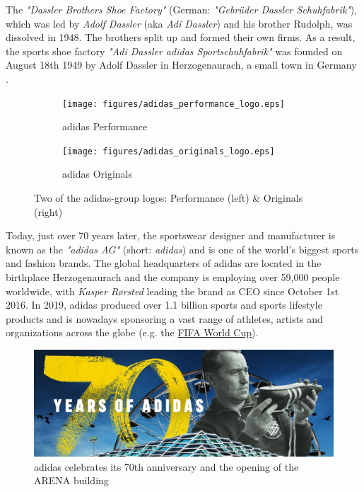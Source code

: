 

The \textit{"Dassler Brothers Shoe Factory"} (German: \textit{"Gebrüder Dassler Schuhfabrik"}), which was led by \textit{Adolf Dassler} (aka \textit{Adi Dassler}) and his brother Rudolph, was dissolved in 1948. The brothers split up and formed their own firms. As a result, the sports shoe factory \textit{"Adi Dassler adidas Sportschuhfabrik"} was founded on August 18th 1949 by Adolf Dassler in Herzogenaurach, a small town in Germany \citep{adidas-group}. \\

\begin{figure}[H]
\centering
\begin{subfigure}{.4\textwidth}
  \centering
  \texttt{[image: figures/adidas\_performance\_logo.eps]}
  \caption{adidas Performance}
  \label{fig:adidas_performance_logo}
\end{subfigure}
\begin{subfigure}{.4\textwidth}
  \centering
  \texttt{[image: figures/adidas\_originals\_logo.eps]}
  \caption{adidas Originals}
  \label{fig:adidas_originals_logo}
\end{subfigure}
\caption{Two of the adidas-group logos: Performance (left) \& Originals (right) \\ \citep{adidasmediacenter}}
\label{fig:adidas_logos}
\end{figure} 


Today, just over 70 years later, the sportswear designer and manufacturer is known as the \textit{"adidas AG"} (short: \textit{adidas}) and is one of the world's biggest sports and fashion brands. The global headquarters of adidas are located in the birthplace Herzogenaurach and the company is employing over 59,000 people worldwide, with \textit{Kasper R\o rsted} leading the brand as CEO since October 1st 2016. In 2019, adidas produced over 1.1 billion sports and sports lifestyle products \citep{adidas-group-profile} and is nowadays sponsoring a vast range of athletes, artists and organizations across the globe (e.g. the  \href{https://www.fifa.com/worldcup/}{FIFA World Cup\texttrademark}).\\

\begin{figure}[H]
\centering
  \includegraphics[width=.95\linewidth]{figures/adidas_70_years.eps}
  \caption{adidas celebrates its 70th anniversary and the opening of the ARENA building \citep{adidas70years}}
  \label{fig:adidas_70_years}
\end{figure}

